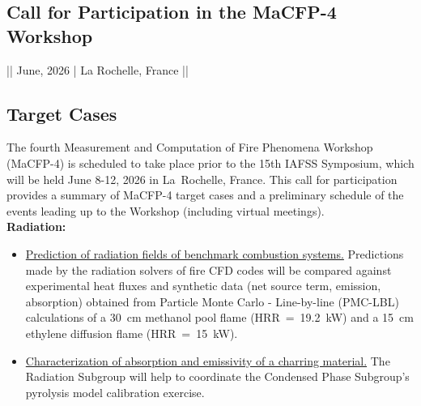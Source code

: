 \documentclass[12pt]{article}
\begin{document}
\begin{center}

\section*{Call for Participation in the MaCFP-4 Workshop}
{\large || June, 2026   |   La Rochelle, France ||}
\end{center}

\subsection*{Target Cases} 
\label{Target Cases}
\small
The fourth Measurement and Computation of Fire Phenomena Workshop (MaCFP-4) is scheduled to take place prior to the 15th IAFSS Symposium, which will be held June 8-12, 2026 in La~Rochelle, France. This call for participation provides a summary of MaCFP-4 target cases and a preliminary schedule of the events leading up to the Workshop (including virtual meetings).\\

\textbf{Radiation:}
\begin{itemize} [noitemsep]
    \item \underline{Prediction of radiation fields of benchmark combustion systems.} Predictions made by the radiation solvers of fire CFD codes will be compared against experimental heat fluxes and synthetic data (net source term, emission, absorption) obtained from Particle Monte Carlo - Line-by-line (PMC-LBL) calculations of a 30~cm methanol pool flame (HRR~=~19.2~kW) and a 15~cm ethylene diffusion flame (HRR~=~15~kW). 
\item \underline{Characterization of absorption and emissivity of a charring material.} The Radiation Subgroup will  help to coordinate the Condensed Phase Subgroup's pyrolysis model calibration exercise.
\end{itemize}
\end{document}
